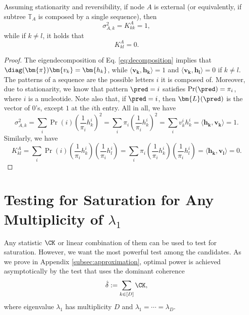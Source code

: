 \begin{appendices}
\begin{prop} \label{prop:memorySequence}
    Assuming stationarity and reversibility, if node $A$ is external (or equivalently, if subtree $\mathbb{T}_A$ is composed by a single sequence), then \[\sigma^2_{A,k} = K^A_{kk} = 1,\] 
    while if $k \neq l$, it holds that 
    \[K^A_{kl}= 0.\]
\end{prop}
\begin{proof}
   The eigendecomposition of Eq. \ref{eq:decomposition} implies that $\diag(\bm{\pi}) \bm{v_k} = \bm{h_k}$, while $\langle \bm{v_k} ,\bm{h_k} \rangle = 1$ and $\langle \bm{v_k} ,\bm{h_l} \rangle = 0$ if $k \neq l$. The patterns of a sequence are the possible letters $i$ it is composed of.  Moreover, due to stationarity, we know that pattern $\pred = i$ satisfies $\Pr(\pred) = \pi_i$, where $i$ is a nucleotide. Note also that, if $\pred = i$,  then $\bm{L}(\pred)$ is the vector of $0$'s, except $1$ at the $i$th entry. All in all, we have
\begin{equation}
\sigma^2_{A,k} = \sum_i \Pr(i) (\frac{1}{\pi_i} h_k^i )^2 = \sum_i \pi_i (\frac{1}{\pi_i} h_k^i )^2 = \sum_i v_k^i h_k^i = \langle \bm{h_k}, \bm{v_k} \rangle= 1.
\end{equation}
Similarly, we have 
\begin{equation}
  K^A_{kl}   = \sum_i \Pr(i) (\frac{1}{\pi_i} h_k^i )(\frac{1}{\pi_i} h_l^i ) = \sum_i \pi_i (\frac{1}{\pi_i} h_k^i )(\frac{1}{\pi_i} h_l^i ) = \langle \bm{h_k}, \bm{v_l} \rangle = 0.
\end{equation}
\end{proof}

\clearpage

\section{Testing for Saturation for Any Multiplicity of \texorpdfstring{$\lambda_1$}{l1}}
\label{sec:multiplicityGreaterThan1}

Any statistic $\CK$ or linear combination of them can be used to test for saturation. However, we want the most powerful test among the candidates. As we prove in Appendix \ref{subsec:approximation}, optimal power is achieved asymptotically by the test that uses the dominant coherence 
\begin{equation}\label{eq:dominant_coherence}
\hat{\delta}:= \sum_{k \in [D]}\CK,
\end{equation} 
where eigenvalue $\lambda_1$ has multiplicity $D$ and $\lambda_1 = \cdots = \lambda_D$.


\end{appendices}
